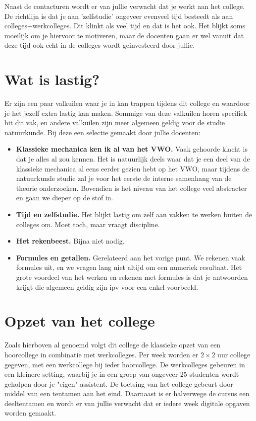 Naast de contacturen wordt er van jullie verwacht dat je werkt aan het college. De richtlijn is dat je aan 'zelfstudie'
ongeveer evenveel tijd besteedt als aan colleges+werkcolleges. Dit klinkt als veel tijd en dat is het ook. Het
blijkt soms moeilijk om je hiervoor te motiveren, maar de docenten gaan er wel vanuit dat deze tijd ook echt
in de colleges wordt geinvesteerd door jullie.

\section*{Wat is lastig?}

Er zijn een paar valkuilen waar je in kan trappen tijdens dit college en waardoor je het jezelf extra lastig kan 
maken. Sommige van deze valkuilen horen specifiek bit dit vak, en  andere valkuilen zijn meer algemeen
geldig voor de studie natuurkunde. Bij deze een selectie gemaakt door jullie docenten:
\begin{itemize}
\item{\bf Klassieke mechanica ken ik al van het VWO.}  Vaak gehoorde klacht is dat je alles al zou kennen. Het
is natuurlijk deels waar dat je een deel van de klassieke mechanica al eens eerder gezien hebt op het VWO, maar
tijdens de natuurkunde studie zal je voor het eerste de interne samenhang van de theorie onderzoeken. Bovendien
is het niveau van het college veel abstracter en gaan we dieper op de stof in.
\item{\bf Tijd en zelfstudie.}  Het blijkt lastig om zelf aan vakken te werken buiten de colleges om. Moet toch, maar
vraagt discipline.
\item{\bf Het rekenbeest.} Bijna niet nodig.
\item{\bf Formules en getallen.} Gerelateerd aan het vorige punt. We rekenen vaak formules uit, en we vragen
lang niet altijd om een numeriek resultaat. Het grote voordeel van het werken en rekenen met formules is dat je
antwoorden krijgt die algemeen geldig zijn ipv voor een enkel voorbeeld.  
\end{itemize}

\section*{Opzet van het college}

Zoals hierboven al genoemd volgt dit college de klassieke opzet van een hoorcollege in combinatie met 
werkcolleges.  Per week worden er $2\times2$ uur college gegeven, met een werkcollege bij ieder
hoorcollege. De werkcolleges gebeuren in een kleinere setting, waarbij je in een groep van ongeveer
25 studenten wordt geholpen door je "eigen" assistent. De toetsing van het college gebeurt door
middel van een tentamen aan het eind.  Daarnaast is er halverwege de cursus een deeltentamen en wordt
er van jullie verwacht dat er iedere week digitale opgaven worden gemaakt.



